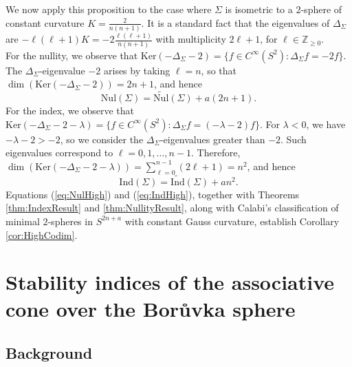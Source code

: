 \documentclass[11pt]{article}
\newcommand{\Ker}{\mathrm{Ker}}
\newcommand{\Z}{\mathbb{Z}}
\theoremstyle{definition}
\numberwithin{equation}{section}
\begin{document}
\indent We now apply this proposition to the case where $\Sigma$ is isometric to a $2$-sphere of constant curvature $K = \frac{2}{n(n+1)}$.  It is a standard fact that the eigenvalues of $\Delta_\Sigma$ are $-\ell(\ell+1)K = -2\frac{\ell(\ell+1)}{n(n+1)}$ with multiplicity $2\ell + 1$, for $\ell \in \Z_{\geq 0}$. \\
\indent For the nullity, we observe that $\Ker(-\Delta_{\Sigma} - 2) = \{f \in C^\infty(S^2) \colon \Delta_{\Sigma} f = -2f\}$.  The $\Delta_\Sigma$-eigenvalue $-2$ arises by taking $\ell = n$, so that $\dim(\Ker(-\Delta_{\Sigma} - 2)) = 2n+1$, and hence
\begin{equation} \label{eq:NulHigh}
\mathrm{Nul}(\Sigma) = \widetilde{\mathrm{Nul}}(\Sigma) + a(2n+1).
\end{equation}
For the index, we observe that $\Ker(-\Delta_{\Sigma} - 2 - \lambda) = \{f \in C^\infty(S^2) \colon \Delta_{\Sigma} f = (-\lambda-2)f\}$.
For $\lambda < 0$, we have $-\lambda - 2 > -2$, so we consider the $\Delta_\Sigma$-eigenvalues greater than $-2$.  Such eigenvalues correspond to $\ell = 0, 1, \ldots, n-1$.  Therefore, $\dim(\Ker(-\Delta_{\Sigma} - 2 - \lambda)) = \sum_{\ell = 0}^{n-1} (2\ell + 1) = n^2$, and hence
\begin{equation} \label{eq:IndHigh}
\mathrm{Ind}(\Sigma) = \widetilde{\mathrm{Ind}}(\Sigma) + an^2.
\end{equation}
Equations (\ref{eq:NulHigh}) and (\ref{eq:IndHigh}), together with Theorems \ref{thm:IndexResult} and \ref{thm:NullityResult}, along with Calabi's classification \cite{Calabi67} of minimal $2$-spheres in $S^{2n+a}$ with constant Gauss curvature, establish Corollary \ref{cor:HighCodim}.


\section{Stability indices of the associative cone over the Bor{\r{u}}vka sphere}  \label{sec:StabIndex}

\subsection{Background}
\end{document}
